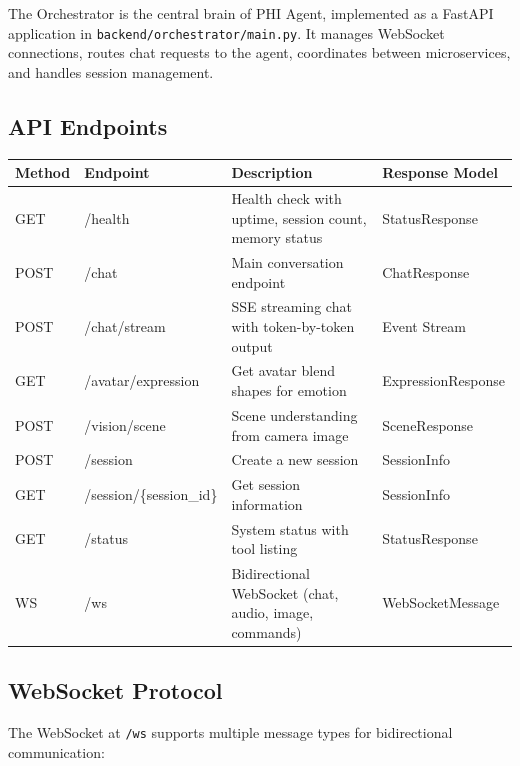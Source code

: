 \documentclass[12pt,a4paper,twoside]{report}
\begin{document}
The Orchestrator is the central brain of PHI Agent, implemented as a FastAPI application in \texttt{backend/orchestrator/main.py}. It manages WebSocket connections, routes chat requests to the agent, coordinates between microservices, and handles session management.

\subsection{API Endpoints}

\begin{longtable}{|l|l|p{6cm}|l|}
\hline
\rowcolor{phiblue!20}
\textbf{Method} & \textbf{Endpoint} & \textbf{Description} & \textbf{Response Model} \\
\hline
GET & /health & Health check with uptime, session count, memory status & StatusResponse \\
\hline
POST & /chat & Main conversation endpoint & ChatResponse \\
\hline
POST & /chat/stream & SSE streaming chat with token-by-token output & Event Stream \\
\hline
GET & /avatar/expression & Get avatar blend shapes for emotion & ExpressionResponse \\
\hline
POST & /vision/scene & Scene understanding from camera image & SceneResponse \\
\hline
POST & /session & Create a new session & SessionInfo \\
\hline
GET & /session/\{session\_id\} & Get session information & SessionInfo \\
\hline
GET & /status & System status with tool listing & StatusResponse \\
\hline
WS & /ws & Bidirectional WebSocket (chat, audio, image, commands) & WebSocketMessage \\
\hline
\end{longtable}
\caption{Orchestrator API Endpoints}

\subsection{WebSocket Protocol}

The WebSocket at \texttt{/ws} supports multiple message types for bidirectional communication:
\end{document}
